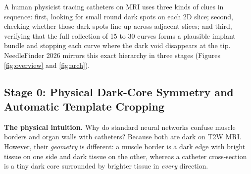 \documentclass[
  11pt,
]{article}
\begin{document}
A human physicist tracing catheters on MRI uses three kinds of clues in
sequence: first, looking for small round dark spots on each 2D slice;
second, checking whether those dark spots line up across adjacent
slices; and third, verifying that the full collection of 15 to 30 curves
forms a plausible implant bundle and stopping each curve where the dark
void disappears at the tip. NeedleFinder 2026 mirrors this exact
hierarchy in three stages (Figures \ref{fig:overview} and
\ref{fig:arch}).

\subsection{Stage 0: Physical Dark-Core Symmetry and Automatic Template
Cropping}\label{stage-0-physical-dark-core-symmetry-and-automatic-template-cropping}

\textbf{The physical intuition.} Why do standard neural networks confuse
muscle borders and organ walls with catheters? Because both are dark on
T2W MRI. However, their \emph{geometry} is different: a muscle border is
a dark edge with bright tissue on one side and dark tissue on the other,
whereas a catheter cross-section is a tiny dark core surrounded by
brighter tissue in \emph{every} direction.
\end{document}
